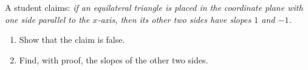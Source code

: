 A student claims: \emph{if an equilateral triangle is placed in the coordinate plane with one side parallel to the $x$-axis, then its other two sides have slopes $1$ and $-1$.}
\begin{enumerate}
\item[(a)] Show that the claim is false.
\item[(b)] Find, with proof, the slopes of the other two sides.
\end{enumerate}
